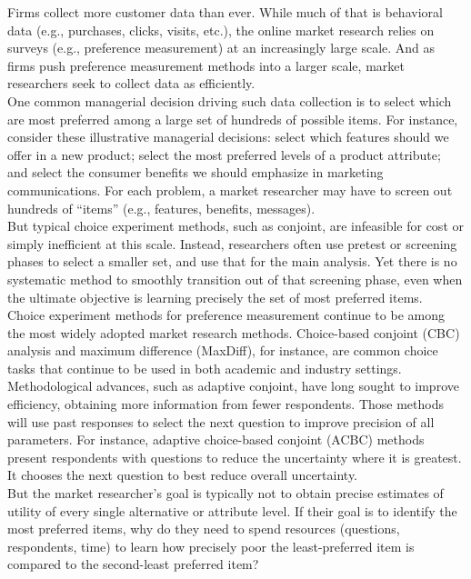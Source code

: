 \documentclass[nonblindrev]{informs3}
\begin{document}
Firms collect more customer data than ever. While much of that is behavioral data (e.g., purchases, clicks, visits, etc.), the online market research relies on surveys (e.g., preference measurement) at an increasingly large scale. And as firms push preference measurement methods into a larger scale, market researchers seek to collect data as efficiently. \\
One common managerial decision driving such data collection is to select which are most preferred among a large set of hundreds of possible items. For instance, consider these illustrative managerial decisions: select which features should we offer in a new product; select the most preferred levels of a product attribute; and select the consumer benefits we should emphasize in marketing communications.  For each problem, a market researcher may have to screen out hundreds of ``items'' (e.g., features, benefits, messages).\\
But typical choice experiment methods, such as conjoint, are infeasible for cost or simply inefficient at this scale. Instead, researchers often use pretest or screening phases to select a smaller set, and use that for the main analysis. Yet there is no systematic method to smoothly transition out of that screening phase, even when the ultimate objective is learning precisely the set of most preferred items. \\
Choice experiment methods for preference measurement continue to be among the most widely adopted market research methods. Choice-based conjoint (CBC) analysis and maximum difference (MaxDiff), for instance, are common choice tasks that continue to be used in both academic and industry settings.\\
Methodological advances, such as adaptive conjoint, have long sought to improve efficiency, obtaining more information from fewer respondents. Those methods will use past responses to select the next question to improve precision of all parameters. For instance, adaptive choice-based conjoint (ACBC) methods present respondents with questions to reduce the uncertainty where it is greatest. It chooses the next question to best reduce overall uncertainty.\\
But the market researcher's goal is typically not to obtain precise estimates of utility of every single alternative or attribute level. If their goal is to identify the most preferred items, why do they need to spend resources (questions, respondents, time) to learn how precisely poor the least-preferred item is compared to the second-least preferred item? \\
\end{document}
